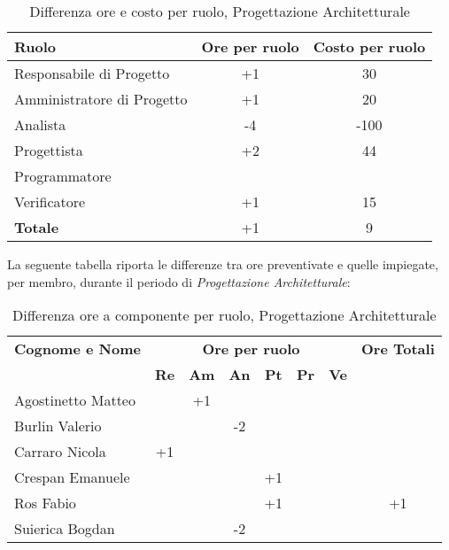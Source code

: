 \begin{table}[h]
	\centering
	\begin{tabular}{|l|c|c|}
		\toprule
		\textbf{Ruolo} & \textbf{Ore per ruolo} & \textbf{Costo per ruolo} \\
		
		\midrule
		Responsabile di Progetto & +1 & 30 \\
		Amministratore di Progetto & +1 & 20 \\ 
		Analista & -4 & -100 \\
		Progettista & +2 & 44 \\
		Programmatore & & \\
		Verificatore & +1 & 15 \\
		\midrule
		\textbf{Totale} & +1 & 9 \\
		
		\bottomrule
	\end{tabular}
	\caption{Differenza ore e costo per ruolo, Progettazione Architetturale}
	\label{tab5}
\end{table} 

\noindent La seguente tabella riporta le differenze tra ore preventivate e quelle impiegate, per membro, durante il periodo di \textit{Progettazione Architetturale}: 
\begin{table}[h]
	\centering
	\begin{tabular}{|l|c|c|c|c|c|c|c|}
		\toprule
		\textbf{Cognome e Nome} & \multicolumn{6}{c}{\textbf{Ore per ruolo}} & \textbf{Ore Totali} \\
		& \textbf{Re} & \textbf{Am} & \textbf{An} & \textbf{Pt} & \textbf{Pr} & \textbf{Ve} & \\
		
		\midrule
		Agostinetto Matteo & & +1 & & & & & \\
		Burlin Valerio & & & -2 & & & & \\ 
		Carraro Nicola & +1 & & & & & & \\
		Crespan Emanuele & & & & +1 & & & \\
		Ros Fabio & & & & +1 & & & +1 \\
		Suierica Bogdan & & & -2 & & & & \\
		
		\bottomrule
	\end{tabular}
	\caption{Differenza ore a componente per ruolo, Progettazione Architetturale}
\end{table}

